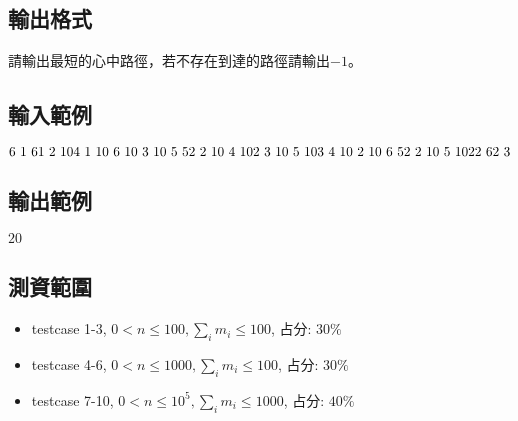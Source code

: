 \documentclass{article}
\begin{document}
\begin{CJK*}{UTF8}{bsmi}
\subsection*{輸出格式}
請輸出最短的心中路徑，若不存在到達的路徑請輸出$-1$。

\subsection*{輸入範例}
$6\ 1\ 6\\1\ 2\ 10\\4\ 1\ 10\ 6\ 10\ 3\ 10\ 5\ 5\\2\ 2\ 10\ 4\ 10\\2\ 3\ 10\ 5\ 10\\3\ 4\ 10\ 2\ 10\ 6\ 5\\2\ 2\ 10\ 5\ 10\\2\\2\ 6\\2\ 3$

\subsection*{輸出範例}
$20$

\subsection*{測資範圍}
\begin{itemize}
    \item testcase 1-3, $0<n\leq100,\sum_i m_i\leq 100$, 占分: $30\%$
    \item testcase 4-6, $0<n\leq1000,\sum_i m_i\leq 100$, 占分: $30\%$
    \item testcase 7-10, $0<n\leq10^5,\sum_i m_i\leq 1000$, 占分: $40\%$
\end{itemize}

\end{CJK*}
\end{document}

